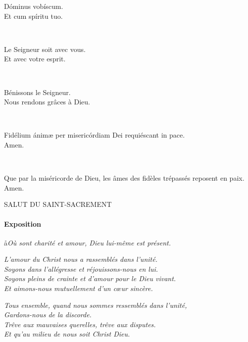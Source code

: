 \documentclass[twoside]{article}
\begin{document}
\begin{paracol}[1]{2}
\vv Dóminus vobíscum. \\
\rr Et cum spíritu tuo.

~~


\switchcolumn

\vv Le Seigneur soit avec vous. \\
\rr Et avec votre esprit.

~~

\vv Bénissons le Seigneur. \\
\rr Nous rendons grâces à Dieu.

\switchcolumn*

~~

\vv Fidélium ánimæ per misericórdiam Dei requiéscant in pace. \\
\rr Amen.

\switchcolumn

~~

\vv Que par la miséricorde de Dieu, les âmes des fidèles trépassés reposent en paix. \\
\rr Amen.

\end{paracol}

\newpage

\begin{center}\begin{doublespace}
{
\MakeUppercase{\Large Salut du Saint-Sacrement}
}
\end{doublespace}\end{center}

\paragraph{Exposition}


\aa \emph{Où sont charité et amour, Dieu lui-même est présent.} 

\vv \emph{L'amour du Christ nous a rassemblés dans l'unité.}\\
\rr \emph{Soyons dans l'allégresse et réjouissons-nous en lui.}\\
\vv \emph{Soyons pleins de crainte et d'amour pour le Dieu vivant.}\\
\rr \emph{Et aimons-nous mutuellement d'un cœur sincère.}

\vv \emph{Tous ensemble, quand nous sommes ressemblés dans l'unité,}\\
\rr \emph{Gardons-nous de la discorde.}\\
\vv \emph{Trêve aux mauvaises querelles, trêve aux disputes.}\\
\rr \emph{Et qu'au milieu de nous soit Christ Dieu.}
\end{document}
